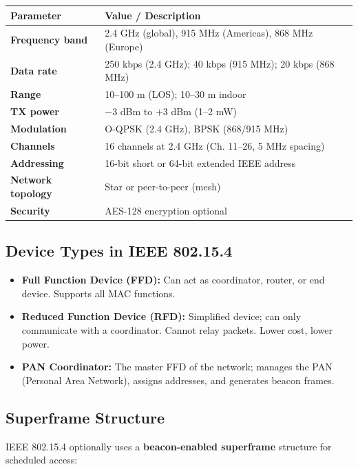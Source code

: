 \documentclass[12pt,a4paper]{article}
\renewcommand{\arraystretch}{1.45}
\begin{document}
\par\noindent
{\renewcommand{\arraystretch}{1.5}%
\begin{tabularx}{\linewidth}{|B{3.4cm}|Y|}
\hline
\textbf{Parameter} & \textbf{Value / Description} \\
\hline
\textbf{Frequency band} & 2.4 GHz (global), 915 MHz (Americas), 868 MHz (Europe) \\
\hline
\textbf{Data rate} & 250 kbps (2.4 GHz); 40 kbps (915 MHz); 20 kbps (868 MHz) \\
\hline
\textbf{Range} & 10--100 m (LOS); 10--30 m indoor \\
\hline
\textbf{TX power} & $-3$ dBm to $+3$ dBm (1--2 mW) \\
\hline
\textbf{Modulation} & O-QPSK (2.4 GHz), BPSK (868/915 MHz) \\
\hline
\textbf{Channels} & 16 channels at 2.4 GHz (Ch. 11--26, 5 MHz spacing) \\
\hline
\textbf{Addressing} & 16-bit short or 64-bit extended IEEE address \\
\hline
\textbf{Network topology} & Star or peer-to-peer (mesh) \\
\hline
\textbf{Security} & AES-128 encryption optional \\
\hline
\end{tabularx}}

\subsection{Device Types in IEEE 802.15.4}
\begin{itemize}[leftmargin=*, itemsep=3pt]
  \item \textbf{Full Function Device (FFD):} Can act as coordinator, router, or end device. Supports all MAC functions.
  \item \textbf{Reduced Function Device (RFD):} Simplified device; can only communicate with a coordinator. Cannot relay packets. Lower cost, lower power.
  \item \textbf{PAN Coordinator:} The master FFD of the network; manages the PAN (Personal Area Network), assigns addresses, and generates beacon frames.
\end{itemize}

\subsection{Superframe Structure}

IEEE 802.15.4 optionally uses a \textbf{beacon-enabled superframe} structure for scheduled access:
\end{document}
